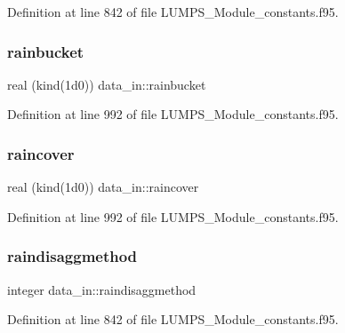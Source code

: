 Definition at line 842 of file L\+U\+M\+P\+S\+\_\+\+Module\+\_\+constants.\+f95.

\mbox{\label{namespacedata__in_a959499405172092dfb8d49b61bfec809}} 
\subsubsection{\texorpdfstring{rainbucket}{rainbucket}}
{\footnotesize\ttfamily real (kind(1d0)) data\+\_\+in\+::rainbucket}



Definition at line 992 of file L\+U\+M\+P\+S\+\_\+\+Module\+\_\+constants.\+f95.

\mbox{\label{namespacedata__in_a8a79043a75a7cba200c72ec10044bcd3}} 
\subsubsection{\texorpdfstring{raincover}{raincover}}
{\footnotesize\ttfamily real (kind(1d0)) data\+\_\+in\+::raincover}



Definition at line 992 of file L\+U\+M\+P\+S\+\_\+\+Module\+\_\+constants.\+f95.

\mbox{\label{namespacedata__in_ae443b92cf02ecc9331aa9f83b2101f90}} 
\subsubsection{\texorpdfstring{raindisaggmethod}{raindisaggmethod}}
{\footnotesize\ttfamily integer data\+\_\+in\+::raindisaggmethod}



Definition at line 842 of file L\+U\+M\+P\+S\+\_\+\+Module\+\_\+constants.\+f95.

\mbox{\label{namespacedata__in_a2ea729731f7651be567d3392e184bf47}} 

